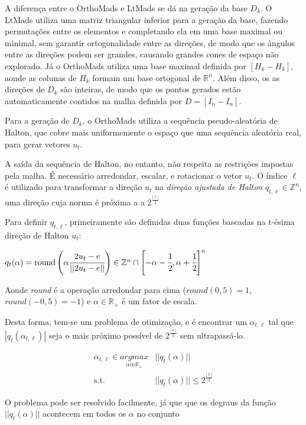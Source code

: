 A diferença entre o OrthoMads e LtMads se dá na geração da base $D_k$. O LtMads utiliza uma matriz triangular inferior para a geração da base, fazendo permutações entre os elementos e completando ela em uma base maximal ou minimal, sem garantir ortogonalidade entre as direções, de modo que os ângulos entre as direções podem ser grandes, causando grandes cones de espaço não explorado.
Já o OrthoMads utiliza uma base maximal definida por $[H_k -H_k]$, aonde as colunas de $H_k$ formam um base ortogonal de $\mathbb{R}^n$. Além disso, os as direções de $D_k$ são inteiras, de modo que os pontos gerados estão automaticamente contidos na malha definida por $D=[I_n -I_n]$.

Para a geração de $D_k$, o OrthoMads utiliza a sequência pseudo-aleatória de Halton, que cobre mais uniformemente o espaço que uma sequência aleatória real, para  gerar vetores $u_t$.

A saída da sequência de Halton, no entanto, não respeita as restrições impostas pela malha. É necessário arredondar, escalar, e rotacionar o vetor $u_t$. O índice $\ell$ é utilizado para transformar a direção $u_t$ na \textit{direção ajustada de Halton} $q_{t,\ell} \in \mathbb{Z}^n$, uma direção cuja norma é próxima a a $2^{\frac{|\ell|}{2}}$


Para definir $q_{t,\ell}$, primeiramente são definidas duas funções baseadas na t-ésima direção de Halton $u_t$:

$q_t(\alpha) = \text{round} \left ( \alpha \cfrac{2u_t - e}{||2u_t - e||} \right ) \in \mathbb{Z}^n \cap \left [ -\alpha - \cfrac{1}{2}, \alpha + \cfrac{1}{2}  \right ]^n$
	
Aonde \textit{round} é a operação arredondar para cima ($round(0,5)=1$, $round(-0,5) = -1$) e $\alpha \in \mathbb{R}_+$ é um fator de escala. 

Desta forma, tem-se um problema de otimização, e é encontrar um $\alpha_{t,\ell}$ tal que $|q_t(\alpha_{t,\ell})|$ seja o mais próximo possível de $2^{\frac{|\ell|}{2}}$ sem ultrapassá-lo.

\begin{align*}
\alpha_{t,\ell} \in \underset{\alpha in \mathbb{R}_+}{\textit{argmax}} & ||q_t(\alpha)|| \\
\text{s.t.} & ||q_t(\alpha)|| \leq 2^{\frac{|\ell|}{2}}
\end{align*}

O problema pode ser resolvido facilmente, já que que os degraus da função $||q_t(\alpha)||$ acontecem em todos os $\alpha$ no conjunto

